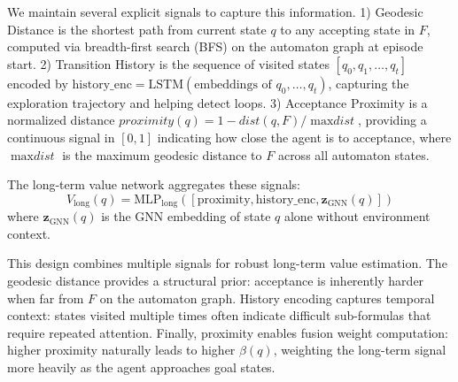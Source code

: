 \documentclass{article}
\begin{document}
We maintain several explicit signals to capture this information. 1) Geodesic Distance is the shortest path from current state $q$ to any accepting state in $F$, computed via breadth-first search (BFS) on the automaton graph at episode start. 2) Transition History is the sequence of visited states $[q_0, q_1, \ldots, q_t]$ encoded by $\text{history\_enc} = \text{LSTM}(\text{embeddings of } q_0, \ldots, q_t)$, capturing the exploration trajectory and helping detect loops. 3) Acceptance Proximity is a normalized distance $\textit{proximity}(q) = 1 - {\textit{dist}(q, F)}/{\max \textit{dist}}$, providing a continuous signal in $[0, 1]$ indicating how close the agent is to acceptance, where $\max \textit{dist}$ is the maximum geodesic distance to $F$ across all automaton states.

The long-term value network aggregates these signals:
\begin{equation}
V_{\text{long}}(q) = \text{MLP}_{\text{long}}([\text{proximity}, \text{history\_enc}, \mathbf{z}_{\text{GNN}}(q)])
\end{equation}
where $\mathbf{z}_{\text{GNN}}(q)$ is the GNN embedding of state $q$ alone without environment context.

This design combines multiple signals for robust long-term value estimation. The geodesic distance provides a structural prior: acceptance is inherently harder when far from $F$ on the automaton graph. History encoding captures temporal context: states visited multiple times often indicate difficult sub-formulas that require repeated attention. Finally, proximity enables fusion weight computation: higher proximity naturally leads to higher $\beta(q)$, weighting the long-term signal more heavily as the agent approaches goal states.

\begin{table}[t]
\centering
\caption{Evaluation Configuration Matrix}
\label{tab:configurations}
\end{table}
\end{document}
